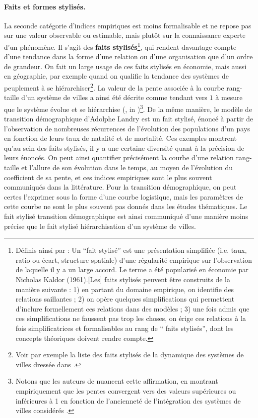 \paragraph{Faits et formes stylisés.}
La seconde catégorie d'indices empiriques est moins formalisable et ne repose pas sur une valeur observable ou estimable, mais plutôt sur la connaissance experte d'un phénomène.
Il s'agit des \og \textbf{faits stylisés}\fg{}\footnote{
	Définis ainsi par \autocite{livet2014diversite}: \og
	Un ``fait stylisé'' est une présentation simplifiée (i.e. taux, ratio ou écart, structure spatiale) d'une régularité empirique sur l'observation de laquelle il y a un large accord.
	Le terme a été popularisé en économie par Nicholas Kaldor (1961).[Les] faits stylisés peuvent être construits de la manière suivante :
	1) en partant du domaine empirique, on identifie des relations saillantes ;
	2) on opère quelques simplifications qui permettent d'inclure formellement ces relations dans des modèles ;
	3) une fois admis que ces simplifications ne faussent pas trop les choses, on érige ces relations à la fois simplificatrices et formalisables au rang de `` faits stylisés'', dont les concepts théoriques doivent rendre compte.\fg{}
}, qui rendent davantage compte d'une tendance dans la forme d'une relation ou d'une organisation que d'un ordre de grandeur.
On fait un large usage de ces faits stylisés en économie, mais aussi en géographie, par exemple quand on qualifie la tendance des systèmes de peuplement à se hiérarchiser\footnote{
	Voir par exemple la liste des \og faits stylisés de la dynamique des systèmes de villes\fg{} dressée dans \textcite[79-80]{schmitt_modelisation_2014}.
}.
La valeur de la pente associée à la courbe rang-taille d'un système de villes a ainsi été décrite comme tendant vers $1$ à mesure que le système évolue et se hiérarchise (\cite{berry_city_2012}, in \cite[\S9]{pumain_multilevel_2015})\footnote{
	Notons que les auteurs de \textcite{pumain_multilevel_2015} nuancent cette affirmation, en montrant empiriquement que les pentes convergent vers des valeurs supérieures ou inférieures à 1 en fonction de l'ancienneté de l'intégration des systèmes de villes considérés \autocite{cura_old_2017}.
}.
De la même manière, le modèle de transition démographique d'Adolphe Landry est un fait stylisé, énoncé à partir de l'observation de nombreuses récurrences de l'évolution des populations d'un pays en fonction de leurs taux de natalité et de mortalité.
Ces exemples montrent qu'au sein des faits stylisés, il y a une certaine diversité quant à la précision de leurs énoncés.
On peut ainsi quantifier précisément la courbe d'une relation rang-taille et l'allure de son évolution dans le temps, au moyen de l'évolution du coefficient de sa pente, et ces indices empiriques sont le plus souvent communiqués dans la littérature.
Pour la transition démographique, on peut certes l'exprimer sous la forme d'une courbe logistique, mais les paramètres de cette courbe ne sont le plus souvent pas donnés dans les études thématiques.
Le fait stylisé \og transition démographique\fg{} est ainsi communiqué d'une manière moins précise que le fait stylisé \og hiérarchisation d'un système de villes\fg{}.

